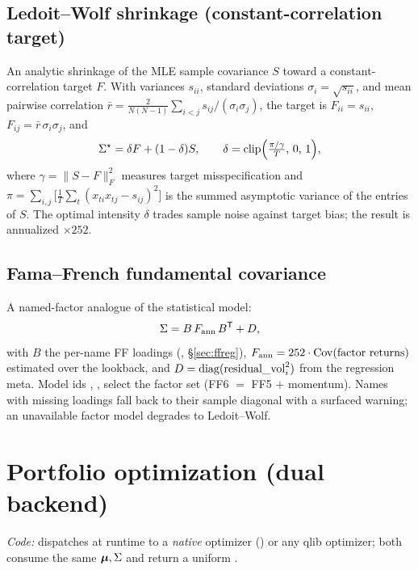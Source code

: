 \documentclass[11pt]{article}
\begin{document}
\subsection{Ledoit--Wolf shrinkage (constant-correlation target)}
\label{sec:lw}
An analytic shrinkage of the MLE sample covariance $S$ toward a
constant-correlation target $F$. With variances $s_{ii}$, standard deviations
$\sigma_i=\sqrt{s_{ii}}$, and mean pairwise correlation
$\bar r=\tfrac{2}{N(N-1)}\sum_{i<j}s_{ij}/(\sigma_i\sigma_j)$, the target is
$F_{ii}=s_{ii}$, $F_{ij}=\bar r\,\sigma_i\sigma_j$, and
\begin{equation}
  \Sigma^\star=\delta F+(1-\delta)S, \qquad
  \delta=\operatorname{clip}\!\Big(\tfrac{\pi/\gamma}{T},\,0,\,1\Big),
\end{equation}
where $\gamma=\lVert S-F\rVert_F^2$ measures target misspecification and
$\pi=\sum_{i,j}\big[\tfrac1T\sum_t (x_{ti}x_{tj}-s_{ij})^2\big]$ is the summed
asymptotic variance of the entries of $S$. The optimal intensity $\delta$ trades
sample noise against target bias; the result is annualized $\times 252$.

\subsection{Fama--French fundamental covariance}
\label{sec:ffcov}
A named-factor analogue of the statistical model:
\begin{equation}
  \Sigma = B\,F_{\text{ann}}\,B^{\mathsf{T}} + D,
\end{equation}
with $B$ the per-name FF loadings (, \S\ref{sec:ffreg}),
$F_{\text{ann}}=252\cdot\operatorname{Cov}(\text{factor returns})$ estimated over the lookback,
and $D=\operatorname{diag}(\text{residual\_vol}_i^2)$ from the regression meta. Model ids
, ,  select the factor set
(FF6 $=$ FF5 $+$ momentum). Names with missing loadings fall back to their sample
diagonal with a surfaced warning; an unavailable factor model degrades to
Ledoit--Wolf.

\section{Portfolio optimization (dual backend)}
\label{sec:opt}
\emph{Code:}  dispatches at runtime to a
\emph{native} optimizer () or any qlib optimizer;
both consume the same $\boldsymbol{\mu},\Sigma$ and return a uniform .
\end{document}
